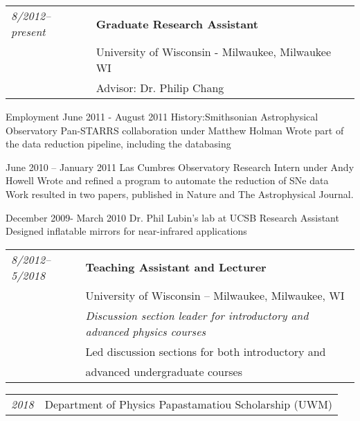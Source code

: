 \documentclass[12pt,notitlepage]{report}
\begin{document}
\begin{tabular}{ll}
{\it 8/2012--present} & {\bf Graduate Research Assistant} \\
				& University of Wisconsin - Milwaukee, Milwaukee WI \\
				& Advisor: Dr. Philip Chang \\
\end{tabular}	        


Employment  June 2011 - August 2011 
History:Smithsonian Astrophysical Observatory  
 Pan-STARRS collaboration under Matthew Holman
Wrote part of the data reduction pipeline, including the databasing

June 2010 – January 2011
 Las Cumbres Observatory
Research Intern under Andy Howell
Wrote and refined a program to automate the reduction of SNe data
Work resulted in two papers, published in Nature and The Astrophysical Journal.

December 2009- March 2010 
 Dr. Phil Lubin’s lab at UCSB
Research Assistant
Designed inflatable mirrors for near-infrared applications

\newpage
			        				
\bigskip
{}
\medskip

\begin{tabular}{ll}
{\it 8/2012--5/2018} & {\bf Teaching Assistant and Lecturer}\\		
				& University of Wisconsin -- Milwaukee, Milwaukee, WI \\
				& {\it Discussion section leader for introductory and advanced physics courses} \\
				& Led discussion sections for both introductory and \\
                                & advanced undergraduate courses \\
			        				
\end{tabular}

%
\bigskip
{}
\medskip

%
\begin{tabular}{ll}
{\it 2018} & Department of Physics Papastamatiou Scholarship (UWM)\\
%
\end{tabular}

\bigskip
{}
\medskip
\end{document}
